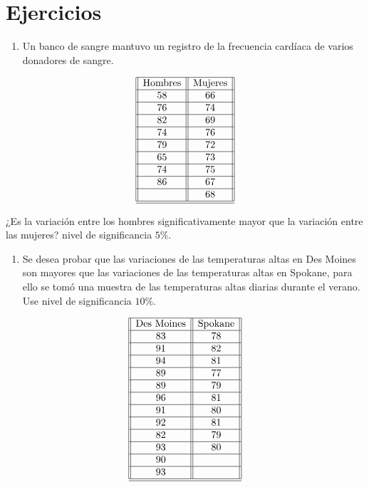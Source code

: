 \documentclass[
  a4paper,
  oneside,
  openany]{book}
\providecommand{\tightlist}{%
  \setlength{\itemsep}{0pt}\setlength{\parskip}{0pt}}
\begin{document}
\hypertarget{ejercicios-7}{%
\section{Ejercicios}\label{ejercicios-7}}

\begin{enumerate}
\def\labelenumi{\arabic{enumi}.}
\tightlist
\item
  Un banco de sangre mantuvo un registro de la frecuencia cardíaca de varios donadores de sangre.
\end{enumerate}

\[
\begin{array}{||c| |c||} 
\hline 
\mbox{Hombres}& \mbox{Mujeres} \\  
 \hline
58&66\\
 \hline
76&74\\
 \hline
82&69\\
 \hline
74&76\\
 \hline
79&72\\
 \hline
65&73\\
 \hline
74&75\\
 \hline
86&67\\
 \hline
&68\\
 \hline
\hline
\end{array}
\]

¿Es la variación entre los hombres significativamente mayor que la variación entre las mujeres? nivel de significancia \(5\%.\)

\begin{enumerate}
\def\labelenumi{\arabic{enumi}.}
\setcounter{enumi}{1}
\tightlist
\item
  Se desea probar que las variaciones de las temperaturas altas en Des Moines son mayores que las variaciones de las temperaturas altas en Spokane, para ello se tomó una muestra de las temperaturas altas diarias durante el verano. Use nivel de significancia \(10\%.\)
\end{enumerate}

\[
\begin{array}{||c| |c||} 
\hline 
\mbox{Des Moines}& \mbox{Spokane} \\ 
 \hline
83&78\\
 \hline
91&82\\
 \hline
94&81\\
 \hline
89&77\\
 \hline
89&79\\
 \hline
96&81\\
 \hline
91&80\\
 \hline
92&81\\
 \hline
82&79\\
 \hline
93&80\\
 \hline
90&\\
 \hline
93&\\
 \hline
\hline
\end{array}
\]
\end{document}
